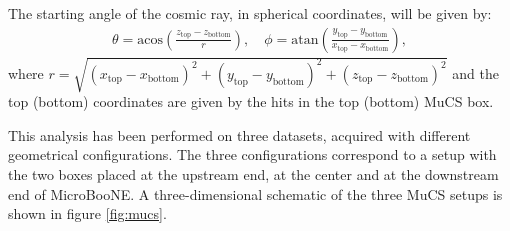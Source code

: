 \documentclass[a4paper,11pt]{article}
\begin{document}
The starting angle of the cosmic ray, in spherical coordinates, will be given by:
\begin{align}\label{eq:angles}
  \theta = \mathrm{acos}\left(\frac{z_{\mathrm{top}}-z_{\mathrm{bottom}}}{r}\right), \quad
  \phi = \mathrm{atan}\left(\frac{y_{\mathrm{top}}-y_{\mathrm{bottom}}}{x_{\mathrm{top}}-x_{\mathrm{bottom}}}\right),
\end{align}
where $r = \sqrt{(x_{\mathrm{top}}-x_{\mathrm{bottom}})^2+(y_{\mathrm{top}}-y_{\mathrm{bottom}})^2+(z_{\mathrm{top}}-z_{\mathrm{bottom}})^2}$ and the top (bottom) coordinates are given by the hits in the top (bottom) MuCS box.


This analysis has been performed on three datasets, acquired with different geometrical configurations. The three configurations correspond to a setup with the two boxes placed at the upstream end, at the center and at the downstream end of MicroBooNE.
A three-dimensional schematic of the three MuCS setups is shown in figure \ref{fig:mucs}.
\end{document}
